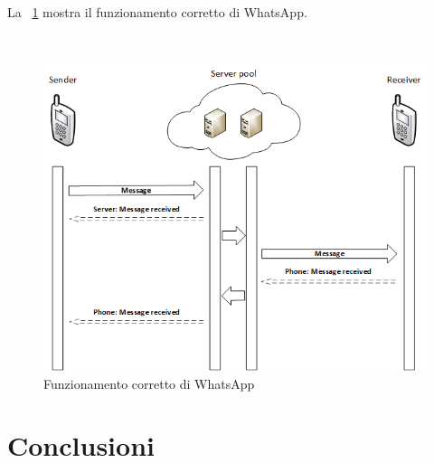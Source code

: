 \documentclass[a4paper,11pt]{book}
\begin{document}
La \figurename ~\ref{fig:lan} mostra il funzionamento corretto di WhatsApp.  

~

\begin{figure}[!ht]
\centering
\includegraphics[scale = 0.8]{true_lan.png}
\caption{Funzionamento corretto di WhatsApp}
\label{fig:lan}
\end{figure}



\chapter{Conclusioni}
\end{document}
